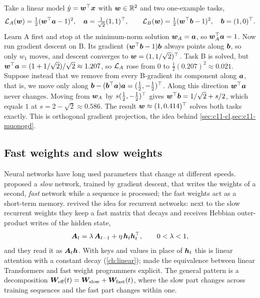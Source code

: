 \begin{example}\label{ex:c11-forgetting}
Take a linear model $\hat y = \bm{w}^{\top}\bm{x}$ with $\bm{w} \in \mathbb{R}^2$ and two one-example tasks,
\[
  \mathcal{L}_A(\bm{w}) = \tfrac12(\bm{w}^{\top}\bm{a} - 1)^2, \quad \bm{a} = \tfrac{1}{\sqrt2}(1,1)^{\top},
  \qquad
  \mathcal{L}_B(\bm{w}) = \tfrac12(\bm{w}^{\top}\bm{b} - 1)^2, \quad \bm{b} = (1,0)^{\top}.
\]
Learn A first and stop at the minimum-norm solution $\bm{w}_A = \bm{a}$, so $\bm{w}_A^{\top}\bm{a} = 1$. Now run
gradient descent on B. Its gradient $(\bm{w}^{\top}\bm{b} - 1)\bm{b}$ always points along $\bm{b}$, so only $w_1$
moves, and descent converges to $\bm{w} = (1, 1/\sqrt2)^{\top}$. Task B is solved, but
$\bm{w}^{\top}\bm{a} = (1 + 1/\sqrt2)/\sqrt2 \approx 1.207$, so $\mathcal{L}_A$ rose from $0$ to
$\tfrac12(0.207)^2 \approx 0.021$. Suppose instead that we remove from every B-gradient its
component along $\bm{a}$, that is, we move only along
$\bm{b} - (\bm{b}^{\top}\bm{a})\bm{a} = (\tfrac12, -\tfrac12)^{\top}$. Along this direction $\bm{w}^{\top}\bm{a}$ never changes.
Moving from $\bm{w}_A$ by $s(\tfrac12,-\tfrac12)^{\top}$ gives $\bm{w}^{\top}\bm{b} = 1/\sqrt2 + s/2$, which
equals $1$ at $s = 2-\sqrt2 \approx 0.586$. The result $\bm{w} \approx (1, 0.414)^{\top}$ solves both
tasks exactly. This is orthogonal gradient projection, the idea behind
\cref{sec:c11-cl,sec:c11-muonogd}.
\end{example}

\subsection{Fast weights and slow weights}\label{sec:c11-fastslow}

Neural networks have long used parameters that change at different speeds.
\citet{schmidhuber1992fastweights} proposed a \emph{slow} network, trained by gradient descent,
that writes the weights of a second, \emph{fast} network while a sequence is processed; the fast
weights act as a short-term memory. \citet{ba2016fastweights} revived the idea for recurrent
networks: next to the slow recurrent weights they keep a fast matrix that decays and receives
Hebbian outer-product writes of the hidden state,
\begin{equation}
  \bm{A}_t = \lambda\,\bm{A}_{t-1} + \eta\,\bm{h}_t\bm{h}_t^{\top}, \qquad 0<\lambda<1,
  \label{eq:c11-ba}
\end{equation}
and they read it as $\bm{A}_t\bm{h}$. With keys and values in place of $\bm{h}_t$ this is linear attention
with a constant decay (\cref{ch:linear}); \citet{c02-schlag2021linear} made the equivalence between
linear Transformers and fast weight programmers explicit. The general pattern is a decomposition
$\bm{W}_{\text{eff}}(t) = \bm{W}_{\text{slow}} + \bm{W}_{\text{fast}}(t)$, where the slow part changes
across training sequences and the fast part changes within one.

